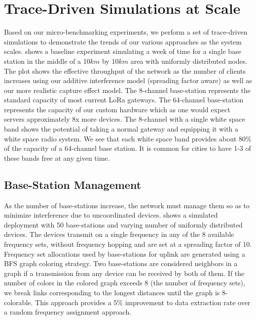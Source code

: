 \section{Trace-Driven Simulations at Scale}
\label{sec:simulations}

Based on our micro-benchmarking experiments, we perform a set of trace-driven simulations to demonstrate the trends of our various approaches as the system scales.   shows a baseline experiment simulating a week of time for a single base station in the middle of a 10$km$ by 10$km$ area with uniformly distributed nodes. The plot shows the effective throughput of the network as the number of clients increases using our additive interference model (spreading factor aware) as well as our more realistic capture effect model.  The 8-channel base-station represents the standard capacity of most current LoRa gateways.  The 64-channel base-station represents the capacity of our custom hardware which as one would expect servers approximately 8x more devices.  The 8-channel with a single white space band shows the potential of taking a normal gateway and equipping it with a white space radio system.  We see that each white space band provides about 80\% of the capacity of a 64-channel base station.  It is common for cities to have 1-3 of these bands free at any given time. 
 
\subsection{Base-Station Management}
\label{sec:bs-management}
As the number of base-stations increase, the network must manage them so as to minimize interference due to uncoordinated devices.  shows a simulated deployment with 50 base-stations and varying number of uniformly distributed devices. The devices transmit on a single frequency in any of the 8 available frequency sets, without frequency hopping and are set at a spreading factor of 10. Frequency set allocations used by base-stations for uplink are generated using a BFS graph coloring strategy. Two base-stations are considered neighbors in a graph if a transmission from any device can be received by both of them. If the number of colors in the colored graph exceeds 8 (the number of frequency sets), we break links corresponding to the longest distances until the graph is 8-colorable. This approach provides a 5\% improvement to data extraction rate over a random frequency assignment approach.

